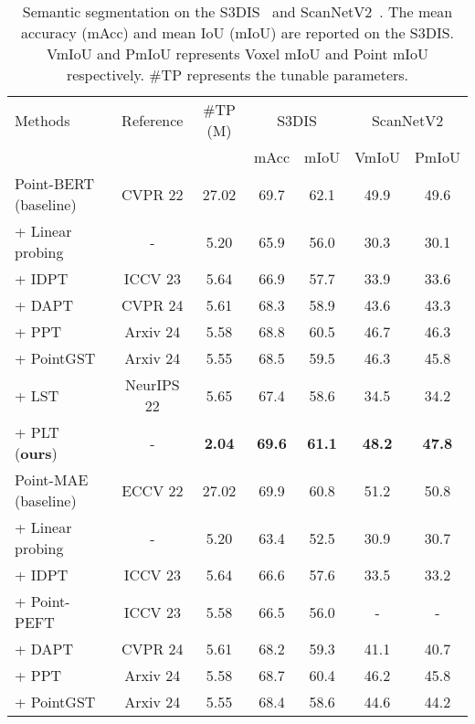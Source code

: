 \begin{table}
  \centering
  \scriptsize
  \setlength{\tabcolsep}{1.1mm}
  \caption{Semantic segmentation on the S3DIS~\cite{armeni20163d} and ScanNetV2~\cite{dai2017scannet}. The
    mean accuracy (mAcc) and mean IoU (mIoU) are reported on the S3DIS. VmIoU and PmIoU represents Voxel mIoU and Point mIoU respectively.
    \#TP represents the tunable parameters.}
    \begin{tabular}{lcccccc}
    \toprule
    Methods & Reference & \#TP (M)& \multicolumn{2}{c}{S3DIS} & \multicolumn{2}{c}{ScanNetV2} \\
    & & & mAcc & mIoU & VmIoU & PmIoU \\
    \midrule
    Point-BERT~\cite{yu2022point} (baseline) &  CVPR 22 & 27.02 & 69.7 & 62.1 & 49.9 & 49.6 \\ 
    + Linear probing & - & 5.20  & 65.9  & 56.0 & 30.3 & 30.1  \\
    + IDPT~\cite{zha2023instance} & ICCV 23 & 5.64  & 66.9  & 57.7 & 33.9 & 33.6  \\
    + DAPT~\cite{zhou2024dynamic} & CVPR 24 & 5.61  & 68.3 & 58.9 & 43.6 & 43.3 \\
    + PPT~\cite{zhang2024positional} & Arxiv 24 & 5.58 & 68.8 & 60.5 & 46.7 & 46.3 \\
    + PointGST~\cite{liang2024parameter} & Arxiv 24 & 5.55  & 68.5 & 59.5 & 46.3 & 45.8  \\
    + LST~\cite{sung2022lst} & NeurIPS 22 & 5.65 & 67.4 & 58.6 & 34.5 & 34.2  \\
    \rowcolor{linecolor!40}+ PLT (\textbf{ours})& - & \textbf{2.04}  & \textbf{69.6} & \textbf{61.1} & \textbf{48.2} & \textbf{47.8}  \\
    \midrule
    Point-MAE~\cite{pang2022masked} (baseline) &  ECCV 22 & 27.02 & 69.9 & 60.8 & 51.2 & 50.8 \\ 
    + Linear probing & - & 5.20  & 63.4  & 52.5 & 30.9 & 30.7 \\
    + IDPT~\cite{zha2023instance} & ICCV 23 & 5.64  & 66.6  & 57.6 & 33.5 & 33.2  \\
    + Point-PEFT~\cite{tang2024point} & ICCV 23 & 5.58  & 66.5  & 56.0 & - & -  \\
    + DAPT~\cite{zhou2024dynamic} & CVPR 24 & 5.61  & 68.2 & 59.3 & 41.1 & 40.7 \\
    + PPT~\cite{zhang2024positional} & Arxiv 24 & 5.58 & 68.7 & 60.4 & 46.2 & 45.8\\
    + PointGST~\cite{liang2024parameter} & Arxiv 24 & 5.55  & 68.4 & 58.6 & 44.6 & 44.2\\

\end{tabular}
\end{table}
